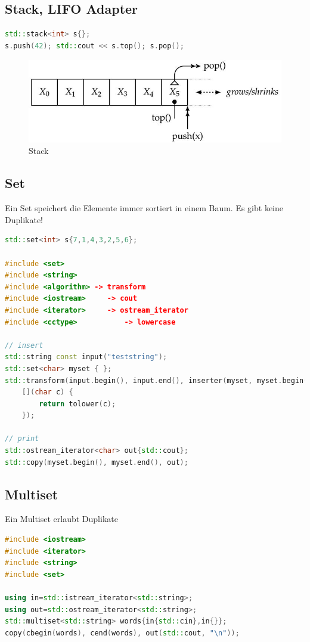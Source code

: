 \clearpage

\subsection{Stack, LIFO Adapter}			
\begin{lstlisting}[language=C++]
std::stack<int> s{};
s.push(42); std::cout << s.top(); s.pop();
\end{lstlisting}
\begin{figure}[h]
	\centering
	\includegraphics[width=0.5\linewidth]{images/stack}
	\caption{Stack}
	\label{fig:stack}
\end{figure}

\subsection{Set}
Ein Set speichert die Elemente immer sortiert in einem Baum. Es gibt keine Duplikate!
\begin{lstlisting}[language=C++]
std::set<int> s{7,1,4,3,2,5,6};

#include <set>
#include <string>
#include <algorithm> -> transform
#include <iostream> 	-> cout
#include <iterator> 	-> ostream_iterator
#include <cctype> 			-> lowercase

// insert
std::string const input("teststring");
std::set<char> myset { };
std::transform(input.begin(), input.end(), inserter(myset, myset.begin()), 
	[](char c) {
		return tolower(c);
	});

// print
std::ostream_iterator<char> out{std::cout};
std::copy(myset.begin(), myset.end(), out);
\end{lstlisting}

\subsection{Multiset}
Ein Multiset erlaubt Duplikate
\begin{lstlisting}[language=C++]
#include <iostream>
#include <iterator>
#include <string>
#include <set>

using in=std::istream_iterator<std::string>;
using out=std::ostream_iterator<std::string>;
std::multiset<std::string> words{in{std::cin},in{}};
copy(cbegin(words), cend(words), out(std::cout, "\n"));
\end{lstlisting}

